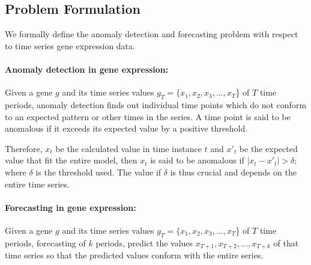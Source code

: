 \subsection{Problem Formulation}

We formally define the anomaly detection and forecasting problem with respect to time series gene expression data.

\paragraph*{\textbf{Anomaly detection in gene expression:}}
Given a gene $g$ and its time series values $g_T=\{x_1,x_2,x_3,\dots,x_T$\} of $T$ time periods, anomaly detection finds out individual time points which do not conform to an expected pattern or other times in the series. A time point is said to be anomalous if it exceeds  its expected value by a positive threshold. 

Therefore, $x_t$ be the calculated value in time instance $t$ and $x'_t$ be the expected value that fit the entire model, then $x_t$ is said to be anomalous if $|x_t-x'_t|> \delta$; where $\delta$ is the threshold used. The value if $\delta$ is thus crucial and depends on the entire time series.

\paragraph*{\textbf{Forecasting in gene expression:}}
Given a gene $g$ and its time series values $g_T=\{x_1,x_2,x_3,\dots,x_T$\} of $T$ time periods, forecasting of $k$ periods, predict the values $x_{T+1},x_{T+2},\dots,x_{T+k}$ of that time series so that the predicted values conform with the entire series. 